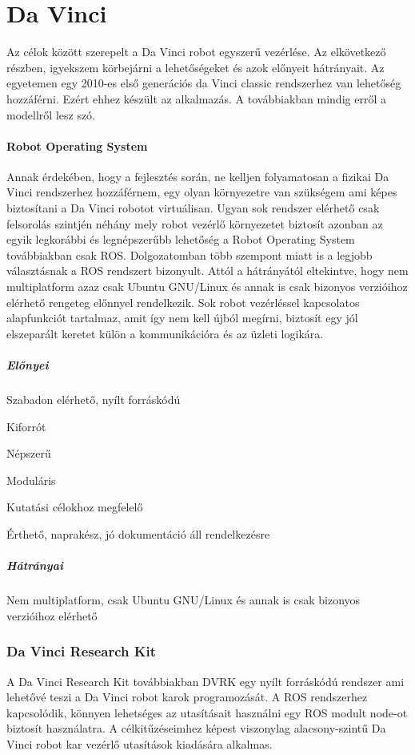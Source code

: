 \documentclass[12pt,a4paper,oneside]{report} %
\begin{document}
\section{Da Vinci}
Az célok között szerepelt a Da Vinci robot egyszerű vezérlése. Az elkövetkező részben, igyekszem körbejárni a lehetőségeket és azok előnyeit hátrányait. Az egyetemen egy 2010-es első generációs da Vinci classic rendszerhez van lehetőség hozzáférni. Ezért ehhez készült az alkalmazás. A továbbiakban mindig erről a modellről lesz szó.
\paragraph{Robot Operating System}
Annak érdekében, hogy a fejlesztés során, ne kelljen folyamatosan a fizikai Da Vinci rendszerhez hozzáférnem, egy olyan környezetre van szükségem ami képes biztosítani a Da Vinci robotot virtuálisan. Ugyan sok rendszer elérhető csak felsorolás szintjén néhány mely robot vezérlő környezetet biztosít azonban az egyik legkorábbi és legnépszerűbb lehetőség a Robot Operating System \cite{quigley2009ros} továbbiakban csak ROS. Dolgozatomban több szempont miatt is a legjobb választásnak a ROS rendszert bizonyult. Attól a hátrányától eltekintve, hogy nem multiplatform azaz csak Ubuntu GNU/Linux és annak is csak bizonyos verzióihoz elérhető rengeteg előnnyel rendelkezik. Sok robot vezérléssel kapcsolatos alapfunkciót tartalmaz, amit így nem kell újból megírni, biztosít egy jól elszeparált keretet külön a kommunikációra és az üzleti logikára.
\subparagraph{Előnyei} 
\begin{compactitem}
	\item Szabadon elérhető, nyílt forráskódú
	\item Kiforrót
	\item Népszerű
	\item Moduláris
	\item Kutatási célokhoz megfelelő
	\item Érthető, naprakész, jó dokumentáció áll rendelkezésre
\end{compactitem}
\subparagraph{Hátrányai} 
\begin{compactitem}
	\item Nem multiplatform, csak Ubuntu GNU/Linux és annak is csak bizonyos verzióihoz elérhető
\end{compactitem}

\subsubsection{Da Vinci Research Kit}
\label{davinci}
A Da Vinci Research Kit \cite{kazanzides2014open} továbbiakban DVRK egy nyílt forráskódú rendszer ami lehetővé teszi a Da Vinci robot karok programozását. A ROS rendszerhez kapcsolódik, könnyen lehetséges az utasításait használni egy ROS modult  node-ot biztosít használatra.  A célkitűzéseimhez képest viszonylag alacsony-szintű Da Vinci robot kar vezérlő utasítások kiadására alkalmas.
\end{document}
